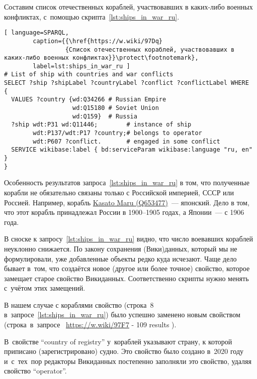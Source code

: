 \newpage
Составим список отечественных кораблей, 
участвовавших в каких-либо военных конфликтах, 
с~помощью скрипта~\ref{lst:ships_in_war_ru}.

\begin{lstlisting}[ language=SPARQL, 
        caption={{\href{https://w.wiki/97Dq}
                 {Список отечественных кораблей, участвовавших в каких-либо военных конфликтах}}\protect\footnotemark}, 
        label=lst:ships_in_war_ru ]
# List of ship with countries and war conflicts
SELECT ?ship ?shipLabel ?countryLabel ?conflict ?conflictLabel WHERE
{
  VALUES ?country {wd:Q34266 # Russian Empire
                   wd:Q15180 # Soviet Union
                   wd:Q159}  # Russia
  ?ship wdt:P31 wd:Q11446;        # instance of ship
        wdt:P137/wdt:P17 ?country;# belongs to operator
        wdt:P607 ?conflict.       # engaged in some conflict
  SERVICE wikibase:label { bd:serviceParam wikibase:language "ru, en" }
}
\end{lstlisting}

Особенность результатов запроса~\ref{lst:ships_in_war_ru} в том, 
что полученные корабли не обязательно связаны только с Российской империей, 
СССР или Россией. 
Например, корабль \href{https://www.wikidata.org/wiki/Q653477}{Kasato Maru (Q653477)}~--- японский. 
Дело в том, что этот корабль принадлежал России в 1900--1905 годах, а Японии~--- с 1906 года.

В сноске к запросу~\ref{lst:ships_in_war_ru} видно, 
что число воевавших кораблей неуклонно снижается. 
По закону сохранения (Вики)данных, который мы не формулировали, 
уже добавленные объекты редко куда исчезают. 
Чаще дело бывает в~том, что создаётся новое (другое или более точное) свойство, 
которое замещает старое свойство Викиданных. 
Соответственно скрипты нужно менять с~учётом этих замещений. 

В нашем случае с кораблями свойство  (строка~8 \TODO в~запросе~\ref{lst:ships_in_war_ru}) 
было успешно заменено новым 
свойством  (строка~\TODO в~запросе~\TODO
\href{https://w.wiki/97F7}{https://w.wiki/97F7} - 109 results
). 

В~свойстве ``country of registry'' у~кораблей указывают страну, к которой приписано (зарегистрировано) судно. 
Это свойство было создано в~2020 году и~с~тех~пор редакторы Викиданных постепенно заполняли это свойство, 
удаляя свойство ``operator''. 








